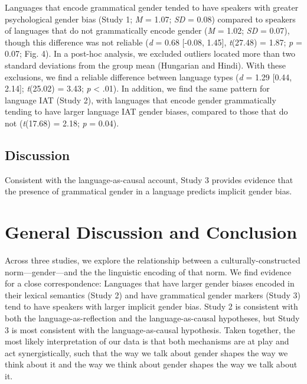 \documentclass[10pt, letterpaper]{article}
\begin{document}
Languages that encode grammatical gender tended to have speakers with
greater psychological gender bias (Study 1; \emph{M} = 1.07; \emph{SD} =
0.08) compared to speakers of languages that do not grammatically encode
gender (\emph{M} = 1.02; \emph{SD} = 0.07), though this difference was
not reliable (\emph{d} = 0.68 {[}-0.08, 1.45{]}, \emph{t}(27.48) = 1.87;
\emph{p} = 0.07; Fig. 4). In a post-hoc analysis, we excluded outliers
located more than two standard deviations from the group mean (Hungarian
and Hindi). With these exclusions, we find a reliable difference between
language types (\emph{d} = 1.29 {[}0.44, 2.14{]}; \emph{t}(25.02) =
3.43; \emph{p} \textless{} .01). In addition, we find the same pattern
for language IAT (Study 2), with languages that encode gender
grammatically tending to have larger language IAT gender biases,
compared to those that do not (\emph{t}(17.68) = 2.18; \emph{p} = 0.04).

\subsection{Discussion}\label{discussion-2}

Consistent with the language-as-causal account, Study 3 provides
evidence that the presence of grammatical gender in a language predicts
implicit gender bias.

\section{General Discussion and
Conclusion}\label{general-discussion-and-conclusion}

Across three studies, we explore the relationship between a
culturally-constructed norm---gender---and the the linguistic encoding
of that norm. We find evidence for a close correspondence: Languages
that have larger gender biases encoded in their lexical semantics (Study
2) and have grammatical gender markers (Study 3) tend to have speakers
with larger implicit gender bias. Study 2 is consistent with both the
language-as-reflection and the language-as-causal hypotheses, but Study
3 is most consistent with the language-as-causal hypothesis. Taken
together, the most likely interpretation of our data is that both
mechanisms are at play and act synergistically, such that the way we
talk about gender shapes the way we think about it and the way we think
about gender shapes the way we talk about it.
\end{document}
